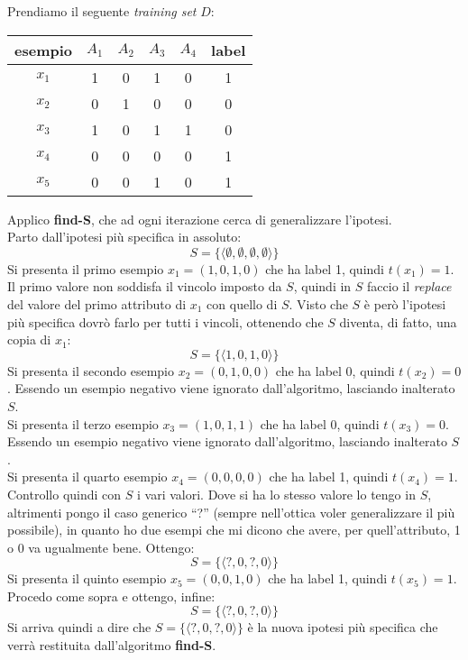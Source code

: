 \begin{esempio}
  Prendiamo il seguente \textit{training set} $D$:
  \begin{table}[H]
    \centering
    \begin{tabular}[H]{c|cccc|c}
      esempio & $A_1$  & $A_2$  & $A_3$  & $A_4$ & label\\
      \hline
      $x_1$ & 1 & 0 & 1 & 0 & 1\\
      $x_2$ & 0 & 1 & 0 & 0 & 0\\
      $x_3$ & 1 & 0 & 1 & 1 & 0\\
      $x_4$ & 0 & 0 & 0 & 0 & 1\\
      $x_5$ & 0 & 0 & 1 & 0 & 1\\
    \end{tabular}
  \end{table}
  Applico \textbf{find-S}, che ad ogni iterazione cerca di generalizzare l'ipotesi.\\
  Parto dall'ipotesi più specifica in assoluto:
  \[S=\{\langle\emptyset,\emptyset,\emptyset,\emptyset\rangle\}\]
  Si presenta il primo esempio $x_1=(1, 0, 1, 0)$ che ha label 1, quindi
  $t(x_1)=1$. Il primo valore non soddisfa il vincolo imposto da
  $S$, quindi in $S$ faccio il \textit{replace} del valore del primo attributo
  di $x_1$ con quello di $S$. Visto che $S$ è però l'ipotesi più specifica dovrò
  farlo per tutti i vincoli, ottenendo che $S$ diventa, di fatto, una copia di
  $x_1$: 
  \[S=\{\langle 1, 0, 1, 0\rangle\}\]
  Si presenta il secondo esempio $x_2=(0, 1, 0, 0)$ che ha label 0, quindi
  $t(x_2)=0$. Essendo un esempio negativo viene ignorato dall'algoritmo,
  lasciando inalterato $S$.\\
  Si presenta il terzo esempio $x_3=(1, 0, 1, 1)$ che ha label 0, quindi
  $t(x_3)=0$. Essendo un esempio negativo viene ignorato dall'algoritmo,
  lasciando inalterato $S$.\\
  Si presenta il quarto esempio $x_4=(0, 0, 0, 0)$ che ha label 1, quindi
  $t(x_4)=1$. Controllo quindi con $S$ i vari valori. Dove si ha lo stesso
  valore lo tengo in $S$, altrimenti pongo il caso generico ``?'' (sempre
  nell'ottica voler generalizzare il più possibile), in quanto ho
  due esempi che mi dicono che avere, per quell'attributo, 1 o 0 va ugualmente
  bene. Ottengo:
  \[S=\{\langle ?, 0,?, 0\rangle\}\]
  Si presenta il quinto esempio $x_5=(0, 0, 1, 0)$ che ha label 1, quindi
  $t(x_5)=1$. Procedo come sopra e ottengo, infine:
  \[S=\{\langle ?, 0,?, 0\rangle\}\]
  Si arriva quindi a dire che $S=\{\langle ?, 0,?, 0\rangle\}$ è la nuova ipotesi
  più specifica che verrà restituita dall'algoritmo \textbf{find-S}.
\end{esempio}
